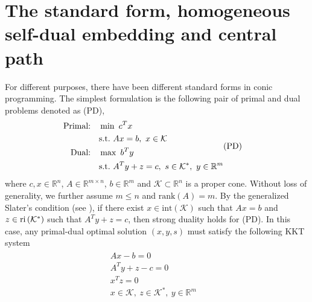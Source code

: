 \documentclass[10pt]{article}
\theoremstyle{definition}
\theoremstyle{plain}
\def\interior{\protect{\textnormal{ri}}}
\begin{document}
\section{The standard form, homogeneous self-dual embedding and central path}
For different purposes, there have been different standard forms in conic programming. The simplest formulation is the following pair of primal and dual problems denoted as (PD), 
\begin{align}
\begin{split} 
\text{Primal:} \quad &\min\,\, c^Tx\\ 
&\textnormal{s.t.} \,\, Ax=b,\ x\in \mathcal{K} \\
\text{Dual:}  \quad &\max\,\, b^Ty \\
&\textnormal{s.t.} \,\, A^Ty+z=c,\ s\in\mathcal{K}^*,\ y \in \mathbb{R}^m \\
\end{split} &\text{(PD)} \nonumber
\end{align}
where $c,x \in \mathbb{R}^n$, $A\in \mathbb{R}^{m\times n}$, $b\in \mathbb{R}^m$ and $\mathcal{K} \subset \mathbb{R}^n$ is a proper cone. Without loss of generality, we further assume $m\leq n$ and $\text{rank}(A) = m$. By the generalized Slater's condition (see \cite{Boyd_Vander_Convex_Opt_Book}), if there exist
$x \in \text{int} \left(\mathcal{K}\right)$ such that $Ax=b$ and $z \in \interior \left(\mathcal{K}^*\right)$ such that $A^Ty+z=c$,
then strong duality holds for (PD). In this case, any primal-dual optimal solution $(x,y,s)$ must satisfy the following KKT system
\begin{align}\label{KKT_for_PD}
\begin{split}
Ax-b=0& \\
A^Ty+z-c=0& \\
x^Tz=0& \\
x\in\mathcal{K},\ z\in \mathcal{K}^*,\ y\in\mathbb{R}^m& 
\end{split}
\end{align}
\end{document}
